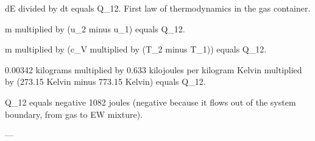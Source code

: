 dE divided by dt equals Q_12. First law of thermodynamics in the gas container.  

m multiplied by (u_2 minus u_1) equals Q_12.  

m multiplied by (c_V multiplied by (T_2 minus T_1)) equals Q_12.  

0.00342 kilograms multiplied by 0.633 kilojoules per kilogram Kelvin multiplied by (273.15 Kelvin minus 773.15 Kelvin) equals Q_12.  

Q_12 equals negative 1082 joules (negative because it flows out of the system boundary, from gas to EW mixture).  

---